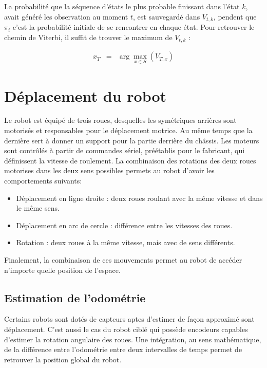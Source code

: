 La probabilité que la séquence d'états le plus probable finissant dans l'état $k$, avait généré les observation au moment $t$, est sauvegardé dans $V_{t,k}$, pendent que $\pi_i$ c'est la probabilité initiale de se rencontrer en chaque état. Pour retrouver le chemin de Viterbi, il suffit de trouver le maximum de $V_{t,k}$ :

\begin{equation*}
  \begin{array}{rcl}
    x_T &=& \arg\max_{x \in S} (V_{T,x})
  \end{array}
\end{equation*}

\section{Déplacement du robot}

Le robot est équipé de trois roues, desquelles les symétriques
arrières sont motorisés et responsables pour le déplacement
motrice. Au même temps que la dernière sert à donner un support pour
la partie derrière du châssis. Les moteurs sont contrôlés à
partir de commandes sériel, préétablis pour le fabricant, qui
définissent la vitesse de roulement. La combinaison des rotations
des deux roues motorises dans les deux sens possibles permets au
robot d'avoir les comportements suivants:

\begin {itemize}
\item Déplacement en ligne droite : deux roues roulant avec la même vitesse et dans le même sens.

\item Déplacement en arc de cercle : différence entre les vitesses des roues.

\item Rotation : deux roues à la même vitesse, mais avec de sens différents.
\end{itemize}


Finalement, la combinaison de ces mouvements permet au robot de
accéder n'importe quelle position de l’espace.

\subsection{Estimation de l'odométrie}

Certains robots sont dotés de capteurs aptes d'estimer de façon
approximé sont déplacement. C'est aussi le cas du robot ciblé qui
possède encodeurs capables d'estimer la rotation angulaire des
roues. Une intégration, au sens mathématique, de la différence entre
l'odométrie entre deux intervalles de temps permet de retrouver la
position global du robot.

